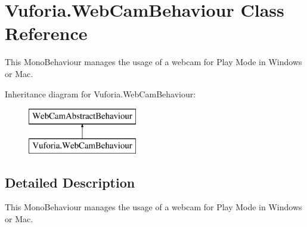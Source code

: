 \hypertarget{class_vuforia_1_1_web_cam_behaviour}{}\section{Vuforia.\+Web\+Cam\+Behaviour Class Reference}
\label{class_vuforia_1_1_web_cam_behaviour}


This Mono\+Behaviour manages the usage of a webcam for Play Mode in Windows or Mac.  


Inheritance diagram for Vuforia.\+Web\+Cam\+Behaviour\+:\begin{figure}[H]
\begin{center}
\leavevmode
\includegraphics[height=2.000000cm]{class_vuforia_1_1_web_cam_behaviour}
\end{center}
\end{figure}


\subsection{Detailed Description}
This Mono\+Behaviour manages the usage of a webcam for Play Mode in Windows or Mac. 

